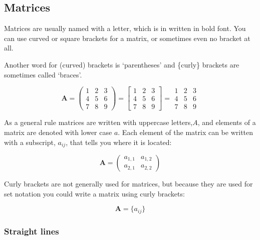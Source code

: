 \documentclass[
]{article}
\begin{document}
\hypertarget{matrices}{%
\subsection{Matrices}\label{matrices}}

Matrices are usually named with a letter, which is in written in bold
font. You can use curved or square brackets for a matrix, or sometimes
even no bracket at all.

Another word for (curved) brackets is `parentheses' and \{curly\}
brackets are sometimes called `braces'.

\begin{equation}
\textbf{A} = 
\begin{pmatrix}
1 & 2 & 3 \\
4 & 5 & 6 \\
7 & 8 & 9
\end{pmatrix}
= 
\begin{bmatrix}
1 & 2 & 3 \\
4 & 5 & 6 \\
7 & 8 & 9
\end{bmatrix}
=
\begin{matrix}
1 & 2 & 3 \\
4 & 5 & 6 \\
7 & 8 & 9
\end{matrix}
\end{equation}

As a general rule matrices are written with uppercase letters,\(A\), and
elements of a matrix are denoted with lower case \(a\). Each element of
the matrix can be written with a subscript, \(a_{ij}\), that tells you
where it is located:

\begin{equation}
\textbf{A} = 
\begin{pmatrix}
a_{1,1} & a_{1,2} \\
a_{2,1} & a_{2,2}
\end{pmatrix}
\end{equation}

Curly brackets are not generally used for matrices, but because they are
used for set notation you could write a matrix using curly brackets:

\begin{equation}
\textbf{A} = \{a_{ij}\}
\end{equation}

\hypertarget{straight-lines}{%
\subsubsection{Straight lines}\label{straight-lines}}
\end{document}
